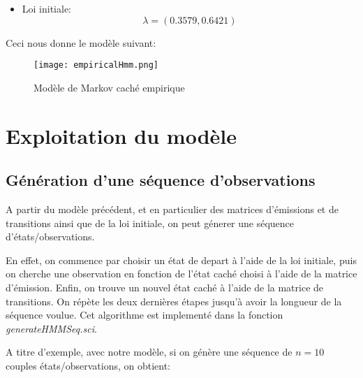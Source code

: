 \documentclass{article}
\begin{document}
\begin{multicols}{2}
\begin{itemize}
    \item Loi initiale:
        \begin{equation}\label{eq:init}
            \lambda = (0.3579, 0.6421)
        \end{equation}
\end{itemize}

Ceci nous donne le modèle suivant:

\begin{figure}[H]
    \begin{center}
        \texttt{[image: empiricalHmm.png]}
        \centering
        \captionsetup{justification=centering}
        \caption{\label{fig:empiricalHmm}Modèle de Markov caché empirique}
    \end{center}
\end{figure}

\section{Exploitation du modèle}\label{sec:exploit}

\subsection{Génération d'une séquence d'observations}

A partir du modèle précédent, et en particulier des matrices d'émissions et de
transitions ainsi que de la loi initiale, on peut génerer une séquence
d'états/observations.

En effet, on commence par choisir un état de depart à l'aide de la loi initiale,
puis on cherche une observation en fonction de l'état caché choisi à l'aide de
la matrice d'émission. Enfin, on trouve un nouvel état caché à l'aide de la
matrice de transitions. On répète les deux dernières étapes jusqu'à avoir la
longueur de la séquence voulue. Cet algorithme est implementé dans la fonction
\emph{generateHMMSeq.sci}.

A titre d'exemple, avec notre modèle, si on génère une séquence de $n = 10$
couples états/observations, on obtient:


\end{multicols}
\end{document}
